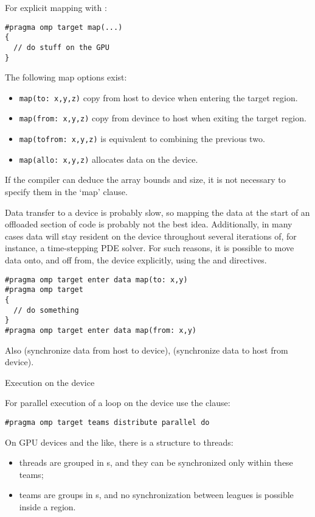 For explicit mapping with :
\begin{lstlisting}
#pragma omp target map(...)
{
  // do stuff on the GPU
}
\end{lstlisting}
The following map options exist:
\begin{itemize}
\item \lstinline+map(to: x,y,z)+ copy from host to device
  when entering the target region.
\item \lstinline+map(from: x,y,z)+ copy from devince to host
  when exiting the target region.
\item \lstinline+map(tofrom: x,y,z)+ is equivalent to combining the previous two.
\item \lstinline+map(allo: x,y,z)+ allocates data on the device.
\end{itemize}

\begin{fortrannote}
  If the compiler can deduce the array bounds and size,
  it is not necessary to specify them in the `map' clause.
\end{fortrannote}

Data transfer to a device is probably slow,
so mapping the data at the start of an offloaded section of code
is probably not the best idea.
Additionally, in many cases data will stay resident on the device
throughout several iterations of, for instance, a time-stepping \ac{PDE} solver.
For such reasons, it is possible to move data onto, and off from,
the device explicitly,
using the  and
 directives.

\begin{lstlisting}
#pragma omp target enter data map(to: x,y)
#pragma omp target
{
  // do something
}
#pragma omp target enter data map(from: x,y)
\end{lstlisting}

Also 
(synchronize data from host to device),
(synchronize data to host from device).

 {Execution on the device}

For parallel execution of a loop on the device
use the  clause:
\begin{lstlisting}
#pragma omp target teams distribute parallel do
\end{lstlisting}

On GPU devices and the like, there is a structure to threads:
\begin{itemize}
\item threads are grouped in s,
  and they can be synchronized only within these teams;
\item teams are groups in s,
  and no synchronization between leagues is possible
  inside a  region.
\end{itemize}

